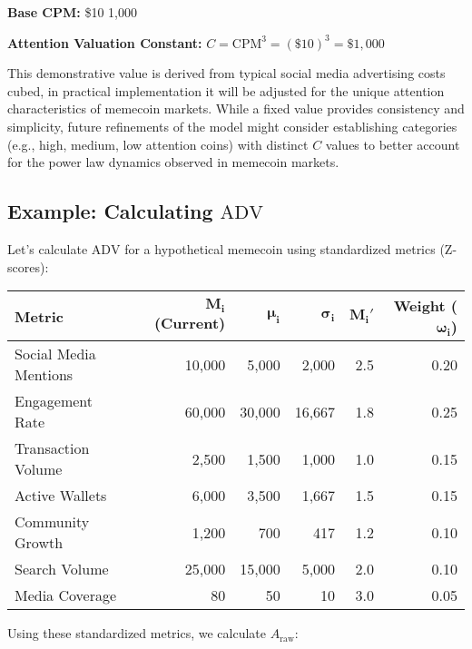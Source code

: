 \documentclass[a4paper,12pt]{article}
\begin{document}
\begin{center}
\textbf{Base CPM:} \$10  1,000 
\end{center}

\begin{center}
\textbf{Attention Valuation Constant:} \( C = \text{CPM}^3 = (\$10)^3 = \$1,000 \)
\end{center}

This demonstrative value is derived from typical social media advertising costs cubed, in practical implementation it will be adjusted for the unique attention characteristics of memecoin markets. While a fixed value provides consistency and simplicity, future refinements of the model might consider establishing categories (e.g., high, medium, low attention coins) with distinct \( C \) values to better account for the power law dynamics observed in memecoin markets.

\subsection*{Example: Calculating \( \text{ADV} \)}
Let's calculate \( \text{ADV} \) for a hypothetical memecoin using standardized metrics (Z-scores):

\begin{center}
\begin{tabular}{|l|r|r|r|r|r|}
\hline
\textbf{Metric} & \(\mathbf{M_i}\) \textbf{(Current)} & \(\mathbf{\mu_i}\) & \(\mathbf{\sigma_i}\) & \(\mathbf{M_i'}\) & \textbf{Weight} (\(\mathbf{\omega_i}\)) \\
\hline
Social Media Mentions & 10,000 & 5,000 & 2,000 & 2.5 & 0.20 \\
Engagement Rate & 60,000 & 30,000 & 16,667 & 1.8 & 0.25 \\
Transaction Volume & 2,500 & 1,500 & 1,000 & 1.0 & 0.15 \\
Active Wallets & 6,000 & 3,500 & 1,667 & 1.5 & 0.15 \\
Community Growth & 1,200 & 700 & 417 & 1.2 & 0.10 \\
Search Volume & 25,000 & 15,000 & 5,000 & 2.0 & 0.10 \\
Media Coverage & 80 & 50 & 10 & 3.0 & 0.05 \\
\hline
\end{tabular}
\end{center}

Using these standardized metrics, we calculate \(A_{\text{raw}}\):
\end{document}
